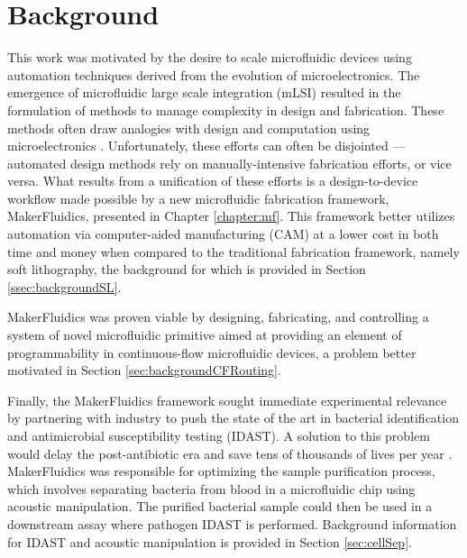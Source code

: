 \chapter{Background}
\label{chapter:background}
\thispagestyle{myheadings}

\graphicspath{{1a_background/Figures/}}

This work was motivated by the desire to scale microfluidic devices using automation techniques derived from the evolution of microelectronics. The emergence of microfluidic large scale integration (mLSI) resulted in the formulation of methods to manage complexity in design and fabrication. These methods often draw analogies with design and computation using microelectronics \cite{minhass2013}. Unfortunately, these efforts can often be disjointed --- automated design methods rely on manually-intensive fabrication efforts, or vice versa. What results from a unification of these efforts is a design-to-device workflow made possible by a new microfluidic fabrication framework, MakerFluidics, presented in Chapter \ref{chapter:mf}. This framework better utilizes automation via computer-aided manufacturing (CAM) at a lower cost in both time and money when compared to the traditional fabrication framework, namely soft lithography, the background for which is provided in Section \ref{ssec:backgroundSL}.

MakerFluidics was proven viable by designing, fabricating, and controlling a system of novel microfluidic primitive aimed at providing an element of programmability in continuous-flow microfluidic devices, a problem better motivated in Section \ref{sec:backgroundCFRouting}. 

Finally, the MakerFluidics framework sought immediate experimental relevance by partnering with industry to push the state of the art in bacterial identification and antimicrobial susceptibility testing (IDAST). A solution to this problem would delay the post-antibiotic era \cite{alanis2005resistance} and save tens of thousands of lives per year \cite{world2004world}. MakerFluidics was responsible for optimizing the sample purification process, which involves separating bacteria from blood in a microfluidic chip using acoustic manipulation. The purified bacterial sample could then be used in a downstream assay where pathogen IDAST is performed. Background information for IDAST and acoustic manipulation is provided in Section \ref{sec:cellSep}.

